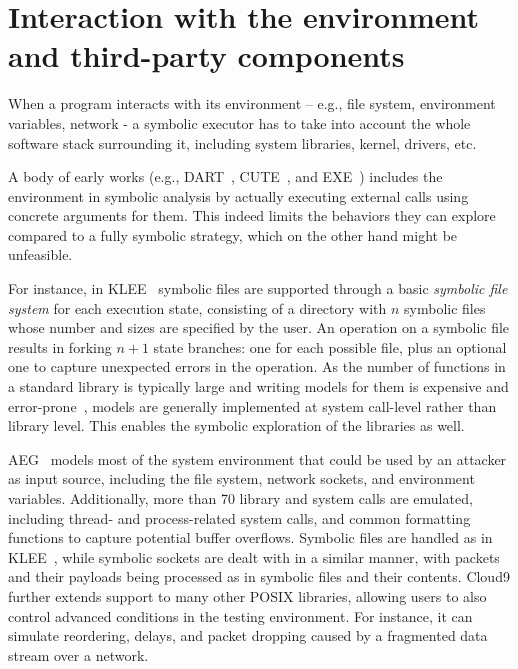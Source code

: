 \section{Interaction with the environment and third-party components}

When a program interacts with its environment -- e.g., file system, environment variables, network - a symbolic executor has to take into account the whole software stack surrounding it, including system libraries, kernel, drivers, etc.

A body of early works (e.g., {\sc DART}~\cite{DART-PLDI05},  {\sc CUTE}~\cite{CUTE-FSE13}, and {\sc EXE}~\cite{EXE-CCS06}) includes the environment in symbolic analysis by actually executing external calls using concrete arguments for them. This indeed limits the behaviors they can explore compared to a fully symbolic strategy, which on the other hand might be unfeasible. 

 For instance, in {\sc KLEE}~\cite{KLEE-OSDI08} symbolic files are supported through a basic {\em symbolic file system} for each execution state, consisting of a directory with $n$ symbolic files whose number and sizes are specified by the user. An operation on a symbolic file results in forking $n+1$ state branches: one for each possible file, plus an optional one to capture unexpected errors in the operation. As the number of functions in a standard library is typically large and writing models for them is expensive and error-prone~\cite{Ball06}, models are generally implemented at system call-level rather than library level. This enables the symbolic exploration of the libraries as well.

{\sc AEG}~\cite{AEG-NDSS11} models most of the system environment that could be used by an attacker as input source, including the file system, network sockets, and environment variables. Additionally, more than 70 library and system calls are emulated, including thread- and process-related system calls, and common formatting functions to capture potential buffer overflows. Symbolic files are handled as in {\sc KLEE}~\cite{KLEE-OSDI08}, while symbolic sockets are dealt with in a similar manner, with packets and their payloads being processed as in symbolic files and their contents. {\sc Cloud9} further extends support to many other POSIX libraries, allowing users to also control advanced conditions in the testing environment. For instance, it can simulate reordering, delays, and packet dropping caused by a fragmented data stream over a network.

